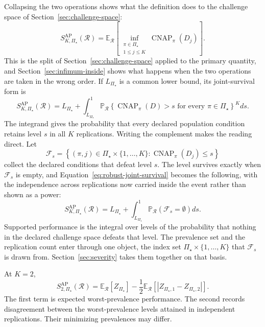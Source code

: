 \documentclass[11pt]{article}
\newcommand{\CNAP}{\operatorname{CNAP}}
\newcommand{\Regime}{\mathcal{R}}
\newcommand{\PSet}{\Pi_\star}
\newcommand{\E}{\mathbb{E}}
\newcommand{\Prb}{\mathbb{P}}
\newcommand{\SRob}{S_{K,\PSet}^{\mathrm{AP}}(\Regime)}
\newcommand{\RefSet}{\mathcal{F}}
\theoremstyle{remark}
\begin{document}
Collapsing the two operations shows what the definition does to the challenge space of Section~\ref{sec:challenge-space}:
\[
\SRob
=
\E_{\Regime}
\left[
\inf_{\substack{\pi\in\PSet\\1\leq j\leq K}}
\CNAP_\pi(D_j)
\right].
\]
This is the split of Section~\ref{sec:challenge-space} applied to the primary quantity, and Section~\ref{sec:infimum-inside} shows what happens when the two operations are taken in the wrong order.
If $L_{\PSet}$ is a common lower bound, its joint-survival form is
\begin{equation}
\SRob
=
L_{\PSet}
+
\int_{L_{\PSet}}^1
\Prb_{\Regime}
\left\{
\CNAP_\pi(D)>s
\text{ for every }\pi\in\PSet
\right\}^{K}
ds.
\label{eq:robust-joint-survival}
\end{equation}
The integrand gives the probability that every declared population condition retains level $s$ in all $K$ replications. Writing the complement makes the reading direct. Let
\begin{equation}
\RefSet_s
=
\left\{
(\pi,j)\in\PSet\times\{1,\ldots,K\}
:
\CNAP_\pi(D_j)\leq s
\right\}
\label{eq:refutation-class}
\end{equation}
collect the declared conditions that defeat level $s$. The level survives exactly when $\RefSet_s$ is empty, and Equation~\eqref{eq:robust-joint-survival} becomes the following, with the independence across replications now carried inside the event rather than shown as a power:
\begin{equation}
\SRob
=
L_{\PSet}
+
\int_{L_{\PSet}}^{1}
\Prb_{\Regime}
\left(
\RefSet_s=\emptyset
\right)
ds .
\label{eq:refutation-integral}
\end{equation}
Supported performance is the integral over levels of the probability that nothing in the declared challenge space defeats that level. The prevalence set and the replication count enter through one object, the index set $\PSet\times\{1,\ldots,K\}$ that $\RefSet_s$ is drawn from. Section~\ref{sec:severity} takes them together on that basis.

At $K=2$,
\begin{equation}
S_{2,\PSet}^{\mathrm{AP}}(\Regime)
=
\E_{\Regime}[Z_{\PSet}]
-
\frac12
\E_{\Regime}
\left[
|Z_{\PSet,1}-Z_{\PSet,2}|
\right].
\label{eq:robust-k2}
\end{equation}
The first term is expected worst-prevalence performance. The second records disagreement between the worst-prevalence levels attained in independent replications. Their minimizing prevalences may differ.
\end{document}
